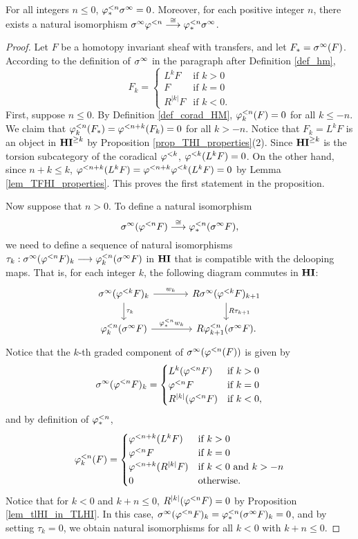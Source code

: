 \begin{prop}
For all integers $n \leq 0$, $\tlHM{n}\spectHI = 0$. Moreover,
for each positive integer $n$, there exists a natural isomorphism
$\spectHI \tlHI{n} \stackrel{\cong}{\to} \tlHM{n}\spectHI$.
\end{prop}
\begin{proof}
Let $F$ be a homotopy invariant sheaf with transfers, and let $F_*
= \spectHI(F)$. According to the definition of $\spectHI$ in the 
paragraph after Definition \ref{def_hm},
\[
F_k = \begin{cases}
L^kF &\textrm{if }k > 0\\
F &\textrm{if }k = 0\\
R^{|k|}F &\textrm{if }k < 0.
\end{cases}
\]
First, suppose $n \leq 0$. By
Definition \ref{def_corad_HM}, $\tlHM[k]{n}(F) = 0$ for all $k \leq -n$.
We claim that $\tlHM[k]{n}(F_*) = \tlHI{n + k}(F_k) = 0$ for all $k > -n$.
Notice that $F_k = L^kF$ is an object in $\THI{k}$ by Proposition
\ref{prop_THI_properties}(2). Since $\THI{k}$ is the torsion
subcategory of the coradical $\tlHI{k}$, $\tlHI{k}(L^kF) = 0$. On the other 
hand, since $n + k \leq k$, $\tlHI{n + k}(L^k F) = 
\tlHI{n + k}\tlHI{k}(L^kF) = 0$ by Lemma \ref{lem_TFHI_properties}. 
This proves the first statement in the proposition.

Now suppose that $n > 0$.
To define a natural isomorphism 
\[
\spectHI (\tlHI{n} F)
\stackrel{\cong}{\to} \tlHM{n}(\spectHI F),
\]
we need to define a sequence of natural isomorphisms
$\tau_k: \spectHI(\tlHI{n}F)_k \to \tlHM[k]{n}(\spectHI F)$ in $\HI$ that is
compatible with the delooping maps. That is, for each integer $k$, the 
following diagram commutes in $\HI$:
\[
\begin{tikzcd}[column sep=large]
\spectHI(\tlHI{k} F)_k \arrow{r}{\deloop_k} \arrow{d}{\tau_k} &
R\spectHI(\tlHI{k} F)_{k + 1} \arrow{d}{R\tau_{k + 1}} \\
\tlHM[k]{n}(\spectHI F) \arrow{r}{\tlHM{n}\deloop_k} &
R\tlHM[k + 1]{n}(\spectHI F).
\end{tikzcd}
\]
Notice that the $k$-th graded component of 
$\spectHI(\tlHI{n}(F))$ is given by
\[
\spectHI(\tlHI{n} F)_k = \begin{cases}
L^k(\tlHI{n}F) &\textrm{if }k > 0\\
\tlHI{n}F    &\textrm{if }k = 0\\
R^{|k|}(\tlHI{n}F) & \textrm{if }k < 0,
\end{cases}
\]
and by definition of $\tlHM{n}$,
\[
\tlHM[k]{n}(F) = 
\begin{cases}
\tlHI{n + k}(L^kF) &\textrm{if }k > 0\\
\tlHI{n}F &\textrm{if }k = 0\\
\tlHI{n + k}(R^{|k|}F) &\textrm{if }k < 0\textrm{ and }k > -n\\
0 &\textrm{otherwise}.
\end{cases}
\]
Notice that for $k < 0$ and $k + n \leq 0$, $R^{|k|}(\tlHI{n}F) = 0$ by Proposition 
\ref{lem_tlHI_in_TLHI}. In this case, $\spectHI (\tlHI{n}F)_k = 
\tlHM{n}(\spectHI F)_k = 0$, and by setting $\tau_k = 0$, we
obtain natural isomorphisms for all $k < 0$ with $k + n \leq 0$.


\end{proof}
